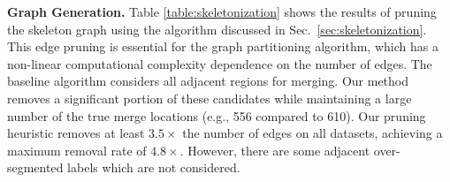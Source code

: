\noindent\textbf{Graph Generation.}
Table \ref{table:skeletonization} shows the results of pruning the skeleton graph using the algorithm discussed in Sec.~\ref{sec:skeletonization}. 
This edge pruning is essential for the graph partitioning algorithm, which has a non-linear computational complexity dependence on the number of edges. 
The baseline algorithm considers all adjacent regions for merging. 
Our method removes a significant portion of these candidates while maintaining a large number of the true merge locations (e.g., 556 compared to 610). 
Our pruning heuristic removes at least $3.5\times$ the number of edges on all datasets, achieving a maximum removal rate of $4.8\times$.
However, there are some adjacent over-segmented labels which are not considered. 

\begin{table}
	\caption{The results of our graph pruning approach compared to the baseline graph with all adjacent regions. We show the number of true merge locations (e.g., 610) compared to total number of edges in the graph (e.g., 23506) for each case. The number of missed splits corresponds to the number of split errors that our method misses compared to an adjacency matrix.}
	\centering
	\label{table:skeletonization}
\end{table}

